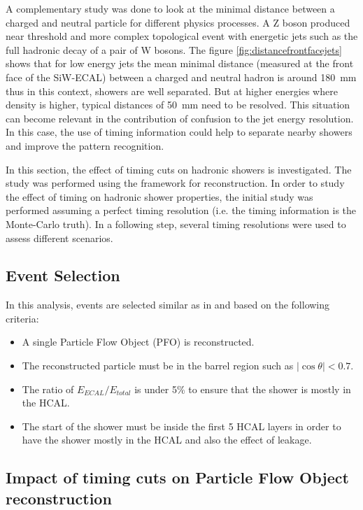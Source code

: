 A complementary study was done to look at the minimal distance between a charged and neutral particle for different physics processes. A Z boson produced near threshold and more complex topological event with energetic jets such as the full hadronic decay of a pair of W bosons. The figure \ref{fig:distancefrontfacejets} shows that for low energy jets the mean minimal distance (measured at the front face of the SiW-ECAL) between a charged and neutral hadron is around \SI{180}{\milli\meter} thus in this context, showers are well separated. But at higher energies where density is higher, typical distances of \SI{50}{\milli\meter} need to be resolved. This situation can become relevant in the contribution of confusion to the jet energy resolution. In this case, the use of timing information could help to separate nearby showers and improve the pattern recognition.

In this section, the effect of timing cuts on hadronic showers is investigated. The study was performed using the \ilcsoft framework for reconstruction. In order to study the effect of timing on hadronic shower properties, the initial study was performed assuming a perfect timing resolution (i.e. the timing information is the Monte-Carlo truth). In a following step, several timing resolutions were used to assess different scenarios.

\subsection{Event Selection}

In this analysis, events are selected similar as in \cite{SoftCompNew2012} and based on the following criteria:
\begin{itemize}
  \item A single Particle Flow Object (PFO) is reconstructed.
  \item The reconstructed particle must be in the barrel region such as $|\cos\theta| < 0.7$.
  \item The ratio of $E_{ECAL}/E_{total}$ is under 5\% to ensure that the shower is mostly in the HCAL.
  \item The start of the shower must be inside the first 5 HCAL layers in order to have the shower mostly in the HCAL and also the effect of leakage.
\end{itemize}

\subsection{Impact of timing cuts on Particle Flow Object reconstruction}

